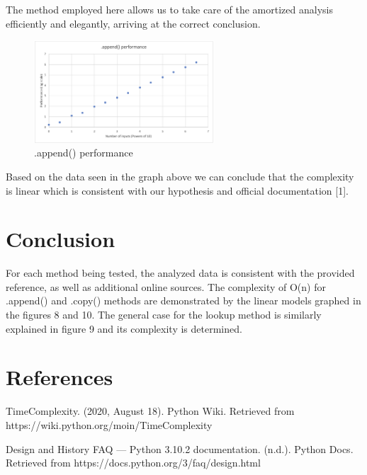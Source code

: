 \documentclass[12pt]{article}
\begin{document}
The method employed here allows us to take care of the amortized analysis efficiently and elegantly, arriving at the correct conclusion. 

\begin{figure}[H]
\centering
\includegraphics[width=0.6\textwidth,height=\textheight,keepaspectratio]{appendgraph.png}
\caption{.append() performance}
\label{Figure: appendgraph}
\end{figure}

Based on the data seen in the graph above we can conclude that the complexity is linear which is consistent with our hypothesis and official documentation [1].

\section{Conclusion}

For each method being tested, the analyzed data is consistent with the provided reference, as well as additional online sources. The complexity of O(n) for .append() and .copy() methods are demonstrated by the linear models graphed in the figures 8 and 10. The general case for the lookup method is similarly explained in figure 9 and its complexity is determined.

\newpage\section*{References}
\begin{enumerate}[label={[\arabic*]}]
\item	TimeComplexity. (2020, August 18). Python Wiki. Retrieved from https://wiki.python.org/moin/TimeComplexity
\item	Design and History FAQ — Python 3.10.2 documentation. (n.d.). Python Docs. Retrieved from https://docs.python.org/3/faq/design.html
\end{enumerate}
\end{document}
